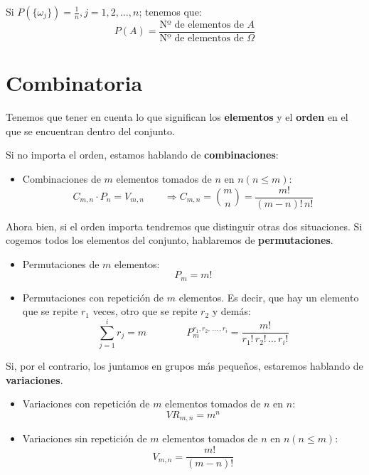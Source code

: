 \documentclass[a4paper]{book}
\begin{document}
Si $P(\{ \omega _j\} ) = \frac{1}{n}, j=1,2,\ldots ,n$; tenemos que:
\[\boxed{P(A) = \frac{\text{Nº de elementos de }A}{\text{Nº de elementos de }\Omega}}\]

\section{Combinatoria}

Tenemos que tener en cuenta lo que significan los \textbf{elementos} y el \textbf{orden} en el que se encuentran dentro del conjunto.

Si no importa el orden, estamos hablando de \textbf{combinaciones}:
\begin{itemize}
	\item Combinaciones de $m$ elementos tomados de $n$ en $n (n\leq m)$: \[C_{m,n}\cdot P_n = V_{m,n} \qquad \Rightarrow C_{m,n} = {\binom{m}{n}} = \frac{m!}{\left( m-n \right)! \, n!}\]
\end{itemize}

Ahora bien, si el orden importa tendremos que distinguir otras dos situaciones. Si cogemos todos los elementos del conjunto, hablaremos de \textbf{permutaciones}.
\begin{itemize}
	\item Permutaciones de $m$ elementos: \[P_m = m!\]
	\item Permutaciones con repetición de $m$ elementos. Es decir, que hay un elemento que se repite $r_1$ veces, otro que se repite $r_2$ y demás: \[\sum^{i}_{j=1}{r_j}=m \qquad \qquad P^{r_1,r_2,\, \ldots\,  , r_i}_m=\frac{m!}{r_1!\, r_2!\, \ldots \, r_i!}\]
\end{itemize}

Si, por el contrario, los juntamos en grupos más pequeños, estaremos hablando de \textbf{variaciones}.

\begin{itemize}
	\item Variaciones con repetición de $m$ elementos tomados de $n$ en $n$: \[VR_{m,n}=m^n\]
	\item Variaciones sin repetición de $m$ elementos tomados de $n$ en $n (n\leq m)$: \[V_{m,n}=\frac{m!}{\left( m-n \right)!} \]
\end{itemize}
\end{document}
